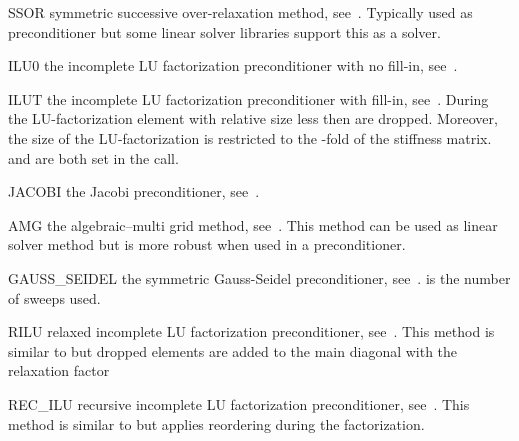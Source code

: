 \begin{memberdesc}[SolverOptions]{SSOR}
symmetric successive over-relaxation method, see~. Typically used as preconditioner but some linear solver libraries support
this as a solver.
\end{memberdesc}

\begin{memberdesc}[SolverOptions]{ILU0}
the incomplete LU factorization preconditioner with no fill-in, see~.
\end{memberdesc}

\begin{memberdesc}[SolverOptions]{ILUT}
the incomplete LU factorization preconditioner with fill-in, see~. During the  LU-factorization element with
relative size less then  are dropped. Moreover, the size of the LU-factorization is restricted to the
-fold of the stiffness matrix.  and  are both set in the
 call.
\end{memberdesc}

\begin{memberdesc}[SolverOptions]{JACOBI}
the Jacobi preconditioner, see~.
\end{memberdesc}


\begin{memberdesc}[SolverOptions]{AMG}
the algebraic--multi grid method, see~. This method can be used as linear solver method but is more robust when used
in a preconditioner.
\end{memberdesc}

\begin{memberdesc}[SolverOptions]{GAUSS_SEIDEL}
the symmetric Gauss-Seidel preconditioner, see~.
 is the number of sweeps used.
\end{memberdesc}

\begin{memberdesc}[SolverOptions]{RILU}
relaxed incomplete LU factorization preconditioner, see~. This method is similar to  but dropped elements are added to the main diagonal 
with the relaxation factor 
\end{memberdesc}

\begin{memberdesc}[SolverOptions]{REC_ILU}
recursive incomplete LU factorization preconditioner, see~. This method is similar to  but applies reordering during the factorization.
\end{memberdesc}

